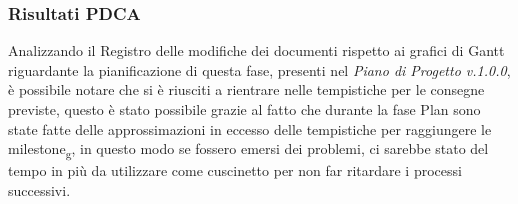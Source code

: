 \documentclass[12pt,a4paper,titlepage]{article}
\begin{document}
    \subsubsection{Risultati PDCA}
    Analizzando il Registro delle modifiche dei documenti rispetto ai grafici di Gantt riguardante la pianificazione di questa fase, presenti nel \textit{Piano di Progetto v.1.0.0}, è possibile notare che si è riusciti a rientrare nelle tempistiche per le consegne previste, questo è stato possibile grazie al fatto che durante la fase Plan sono state fatte delle approssimazioni in eccesso delle tempistiche per raggiungere le milestone\textsubscript{g},
    in questo modo se fossero emersi dei problemi, ci sarebbe stato del tempo in più da utilizzare come cuscinetto per non far ritardare i processi successivi.
    
\end{document}
